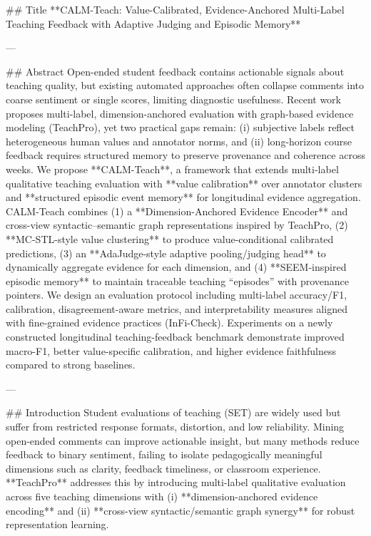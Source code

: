 ## Title  
**CALM-Teach: Value-Calibrated, Evidence-Anchored Multi-Label Teaching Feedback with Adaptive Judging and Episodic Memory**

---

## Abstract  
Open-ended student feedback contains actionable signals about teaching quality, but existing automated approaches often collapse comments into coarse sentiment or single scores, limiting diagnostic usefulness. Recent work proposes multi-label, dimension-anchored evaluation with graph-based evidence modeling (TeachPro), yet two practical gaps remain: (i) subjective labels reflect heterogeneous human values and annotator norms, and (ii) long-horizon course feedback requires structured memory to preserve provenance and coherence across weeks. We propose **CALM-Teach**, a framework that extends multi-label qualitative teaching evaluation with **value calibration** over annotator clusters and **structured episodic event memory** for longitudinal evidence aggregation. CALM-Teach combines (1) a **Dimension-Anchored Evidence Encoder** and cross-view syntactic–semantic graph representations inspired by TeachPro, (2) **MC-STL-style value clustering** to produce value-conditional calibrated predictions, (3) an **AdaJudge-style adaptive pooling/judging head** to dynamically aggregate evidence for each dimension, and (4) **SEEM-inspired episodic memory** to maintain traceable teaching “episodes” with provenance pointers. We design an evaluation protocol including multi-label accuracy/F1, calibration, disagreement-aware metrics, and interpretability measures aligned with fine-grained evidence practices (InFi-Check). Experiments on a newly constructed longitudinal teaching-feedback benchmark demonstrate improved macro-F1, better value-specific calibration, and higher evidence faithfulness compared to strong baselines.

---

## Introduction  
Student evaluations of teaching (SET) are widely used but suffer from restricted response formats, distortion, and low reliability. Mining open-ended comments can improve actionable insight, but many methods reduce feedback to binary sentiment, failing to isolate pedagogically meaningful dimensions such as clarity, feedback timeliness, or classroom experience. **TeachPro** addresses this by introducing multi-label qualitative evaluation across five teaching dimensions with (i) **dimension-anchored evidence encoding** and (ii) **cross-view syntactic/semantic graph synergy** for robust representation learning.

